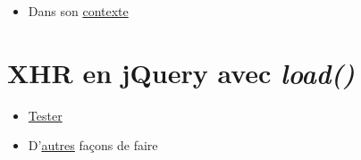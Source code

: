 \begin{itemize}
\tightlist
\item
  Dans son
  \href{http://www.xul.fr/xml-ajax.html\#ajax-exemple}{contexte}
\end{itemize}

\hypertarget{xhr-en-jquery-avec-load}{%
\section{\texorpdfstring{XHR en jQuery avec
\emph{load()}}{XHR en jQuery avec load()}}\label{xhr-en-jquery-avec-load}}

\begin{english}

\begin{Shaded}
\begin{Highlighting}[]
\DataTypeTok{\textgreater{}}
\FunctionTok{$}\NormalTok{(}\NormalTok{)}\NormalTok{(}\NormalTok{()\{}
  \FunctionTok{$}\NormalTok{(}\NormalTok{)}\NormalTok{(}\NormalTok{()\{}
    \FunctionTok{$}\NormalTok{(}\NormalTok{)}\NormalTok{(}\NormalTok{)}\OperatorTok{;}
\NormalTok{  \})}\OperatorTok{;}
\NormalTok{\})}\OperatorTok{;}

\end{Highlighting}
\end{Shaded}

\end{english}

\begin{itemize}
\tightlist
\item
  \href{http://www.w3schools.com/jquery/tryit.asp?filename=tryjquery_ajax_load}{Tester}
\item
  D'\href{https://code.tutsplus.com/tutorials/jquery-succinctly-jquery-and-ajax--net-33856}{autres}
  façons de faire
\end{itemize}

